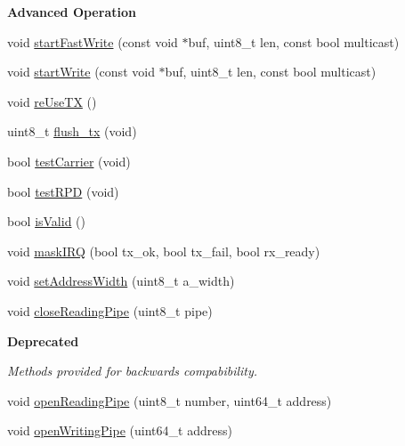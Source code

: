 \begin{Indent}{\bf Advanced Operation}
\begin{DoxyCompactItemize}
void \hyperlink{class_r_f24_a7f27a53cda5f707c817c9a89a8425489}{start\+Fast\+Write} (const void $\ast$buf, uint8\+\_\+t len, const bool multicast)
\item 
void \hyperlink{class_r_f24_aa27519fc289920094422033e0bbf8cf9}{start\+Write} (const void $\ast$buf, uint8\+\_\+t len, const bool multicast)
\item 
void \hyperlink{class_r_f24_aeaf7fa54d3ab2a85ce215b4bf6ae933b}{re\+Use\+T\+X} ()
\item 
uint8\+\_\+t \hyperlink{class_r_f24_adb7915b1d2661a82137573344f659e81}{flush\+\_\+tx} (void)
\item 
bool \hyperlink{class_r_f24_ad0d522ccf39493510e64bf1740be790d}{test\+Carrier} (void)
\item 
bool \hyperlink{class_r_f24_a821285f3b54553f4402eb3fd0ac6d6c1}{test\+R\+P\+D} (void)
\item 
bool \hyperlink{class_r_f24_a35e5f1533b7753806c42b76e782d917e}{is\+Valid} ()
\item 
void \hyperlink{class_r_f24_abf68b9b0c9cd17179e9e144c3e7f9c45}{mask\+I\+R\+Q} (bool tx\+\_\+ok, bool tx\+\_\+fail, bool rx\+\_\+ready)
\item 
void \hyperlink{class_r_f24_ad5aea7f9a3bd9c7d357fb296ce751f21}{set\+Address\+Width} (uint8\+\_\+t a\+\_\+width)
\item 
void \hyperlink{class_r_f24_a9944d93994a80037e3586f340f5e0107}{close\+Reading\+Pipe} (uint8\+\_\+t pipe)
\end{DoxyCompactItemize}
\end{Indent}
\begin{Indent}{\bf Deprecated}\par
{\em Methods provided for backwards compabibility. }\begin{DoxyCompactItemize}
\item 
void \hyperlink{class_r_f24_aa7e8523f86f9f8f20c274e0c89a5fd45}{open\+Reading\+Pipe} (uint8\+\_\+t number, uint64\+\_\+t address)
\item 
void \hyperlink{class_r_f24_a50c8e68ee840e1860a31dbdc83afbd77}{open\+Writing\+Pipe} (uint64\+\_\+t address)
\end{DoxyCompactItemize}
\end{Indent}
